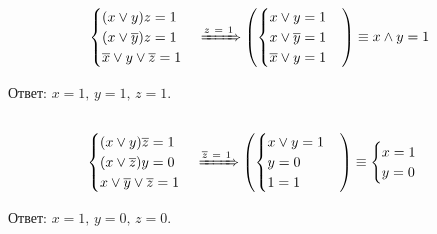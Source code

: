 \documentclass[12pt,a4paper]{article}
\theoremstyle{plain}
\theoremstyle{definition}
\theoremstyle{remark}
\numberwithin{equation}{section}
\begin{document}
\subsection{}
\begin{equation*}
  \begin{aligned}
    \begin{cases}
      (x \lor y)z = 1 \\
      (x \lor \overline y)z = 1 \\
      \overline x \lor y \lor \overline z = 1
    \end{cases}
    \xRightarrow{z\ =\ 1}
    \left(\begin{cases}
      x \lor y = 1 \\
      x \lor \overline y = 1 \\
      \overline x \lor y = 1
    \end{cases}\right)
    \equiv
    x \land y = 1
  \end{aligned}
  \end{equation*}

\noindent Ответ: $x=1,\,y=1,\,z=1$.

\subsection{}
 \begin{equation*}
    \begin{cases}
      (x \lor y)\overline z = 1 \\
      (x \lor \overline z)y = 0 \\
      x \lor \overline y \lor \overline z = 1
    \end{cases}
    \xRightarrow{\overline z\ =\ 1}
    \left(\begin{cases}
      x \lor y = 1 \\
      y = 0 \\
      1 = 1
    \end{cases}\right)
    \equiv
    \begin{cases}
      x = 1 \\
      y = 0
    \end{cases}
  \end{equation*}

\noindent Ответ: $x = 1,\, y = 0,\, z = 0$.
\end{document}
